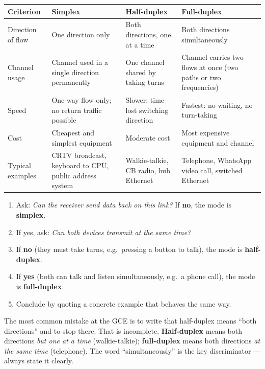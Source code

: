 \documentclass[11pt]{article}
\begin{document}
\begin{center}
\begin{tabularx}{\linewidth}{|l|X|X|X|}
\hline
\rowcolor{popblueL} \textbf{Criterion} & \textbf{Simplex} & \textbf{Half-duplex} & \textbf{Full-duplex} \\
\hline
Direction of flow & One direction only & Both directions, one at a time & Both directions simultaneously \\
\hline
Channel usage & Channel used in a single direction permanently & One channel shared by taking turns & Channel carries two flows at once (two paths or two frequencies) \\
\hline
Speed & One-way flow only; no return traffic possible & Slower: time lost switching direction & Fastest: no waiting, no turn-taking \\
\hline
Cost & Cheapest and simplest equipment & Moderate cost & Most expensive equipment and channel \\
\hline
Typical examples & CRTV broadcast, keyboard to CPU, public address system & Walkie-talkie, CB radio, hub Ethernet & Telephone, WhatsApp video call, switched Ethernet \\
\hline
\end{tabularx}
\end{center}

\begin{methode}
\begin{enumerate}
\item Ask: \emph{Can the receiver send data back on this link?} If \textbf{no}, the mode is \textbf{simplex}.
\item If yes, ask: \emph{Can both devices transmit at the same time?}
\item If \textbf{no} (they must take turns, e.g.\ pressing a button to talk), the mode is \textbf{half-duplex}.
\item If \textbf{yes} (both can talk and listen simultaneously, e.g.\ a phone call), the mode is \textbf{full-duplex}.
\item Conclude by quoting a concrete example that behaves the same way.
\end{enumerate}
\end{methode}

\begin{attention}
The most common mistake at the GCE is to write that half-duplex means ``both directions'' and to stop there. That is incomplete. \textbf{Half-duplex} means both directions \emph{but one at a time} (walkie-talkie); \textbf{full-duplex} means both directions \emph{at the same time} (telephone). The word ``simultaneously'' is the key discriminator --- always state it clearly.
\end{attention}
\end{document}
